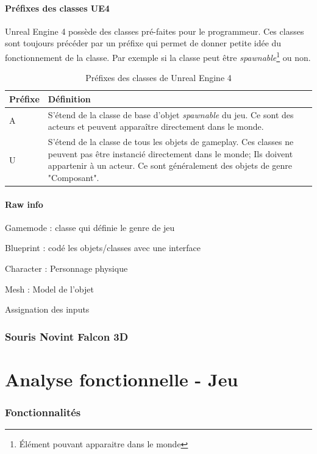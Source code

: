 \documentclass[11pt, a4paper, oneside]{article}
\begin{document}
\subsection{Préfixes des classes UE4}
Unreal Engine 4 possède des classes pré-faites pour le programmeur. Ces classes sont toujours précéder par un préfixe qui permet de donner petite idée du fonctionnement de la classe. Par exemple si la classe peut être \emph{spawnable}\footnote{Élément pouvant apparaitre dans le monde} ou non.
\begin{table}[h]
	\begin{center}
		\begin{tabularx}{\textwidth}{ l X }
			\hline
			\textbf{Préfixe} & \textbf{Définition}\\
			\hline
			\hline
			A & S'étend de la classe de base d'objet \emph{spawnable} du jeu. Ce sont des acteurs et peuvent apparaître directement dans le monde.\\
			\hline
			U & S'étend de la classe de tous les objets de gameplay. Ces classes ne peuvent pas être instancié directement dans le monde; Ils doivent appartenir à un acteur. Ce sont généralement des objets de genre "Composant".\\
			\hline
		\end{tabularx}
		\caption{Préfixes des classes de Unreal Engine 4}
		\label{table:prefixesclasses}
	\end{center}
\end{table}

\subsection{Raw info}
Gamemode : classe qui définie le genre de jeu

Blueprint : codé les objets/classes avec une interface

Character : Personnage physique

Mesh : Model de l'objet

Assignation des inputs


\section{Souris Novint Falcon 3D}
\newpage
\part{Analyse fonctionnelle - Jeu}
\section{Fonctionnalités}
\end{document}
